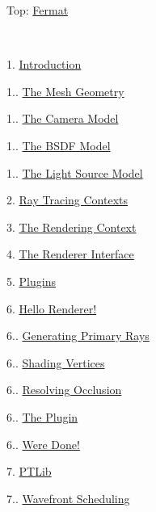 Top\+: \hyperlink{index}{Fermat}

 ~\newline
\begin{DoxyParagraph}{}

\end{DoxyParagraph}

\begin{DoxyItemize}
\item 1. \hyperlink{_overture_page}{Introduction} 
\begin{DoxyItemize}
\item 1.. \hyperlink{_overture_page_MeshesSection}{The Mesh Geometry} 
\item 1.. \hyperlink{_overture_page_CameraSection}{The Camera Model} 
\item 1.. \hyperlink{_overture_page_BSDFSection}{The B\+S\+DF Model} 
\item 1.. \hyperlink{_overture_page_LightSection}{The Light Source Model} 
\end{DoxyItemize}
\item 2. \hyperlink{_r_t_context_page}{Ray Tracing Contexts} 
\item 3. \hyperlink{_rendering_context_page}{The Rendering Context} 
\item 4. \hyperlink{_renderer_interface_page}{The Renderer Interface} 
\item 5. \hyperlink{_plugins_page}{Plugins} 
\item 6. \hyperlink{_hello_renderer_page}{Hello Renderer!} 
\begin{DoxyItemize}
\item 6.. \hyperlink{_hello_renderer_page_HelloPTGeneratingPrimaryRaysSection}{Generating Primary Rays} 
\item 6.. \hyperlink{_hello_renderer_page_HelloPTShadingVerticesSection}{Shading Vertices} 
\item 6.. \hyperlink{_hello_renderer_page_HelloPTSolvingOcclusionSection}{Resolving Occlusion} 
\item 6.. \hyperlink{_hello_renderer_page_HelloPTPluginSection}{The Plugin} 
\item 6.. \hyperlink{_hello_renderer_page_HelloPTDoneSection}{We\textquotesingle{}re Done!} 
\end{DoxyItemize}
\item 7. \hyperlink{_p_t_lib_page}{P\+T\+Lib} 
\begin{DoxyItemize}
\item 7.. \hyperlink{_p_t_lib_page_PTWavefrontSchedulingSection}{Wavefront Scheduling} 

\end{DoxyItemize}
\end{DoxyItemize}

